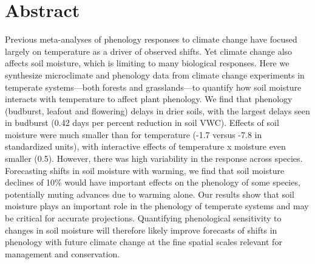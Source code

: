 \documentclass{article}
\begin{document}








\linenumbers

\section*{Abstract} 
Previous meta-analyses of phenology responses to climate change have focused largely on temperature as a driver of observed shifts. Yet climate change also affects soil moisture, which is limiting to many biological responses. Here we synthesize microclimate and phenology data from climate change experiments in temperate systems---both forests and grasslands---to quantify how soil moisture interacts with temperature to affect plant phenology. 
We find that phenology (budburst, leafout and flowering) delays in drier soils, with the largest delays seen in budburst (0.42 days per percent reduction in soil VWC). Effects of soil moisture were much smaller than for temperature (-1.7 versus -7.8 in standardized units), with interactive effects of temperature x moisture even smaller (0.5). However, there was high variability in the response across species. Forecasting shifts in soil moisture with warming, we find that soil moisture declines of 10\% would have important effects on the phenology of some species, potentially muting advances due to warming alone. Our results show that soil moisture plays an important role in the phenology of temperate systems and may be critical for accurate projections. Quantifying phenological sensitivity to changes in soil moisture will therefore likely improve forecasts of shifts in phenology with future climate change at the fine spatial scales relevant for management and conservation.


\newpage
\end{document}
